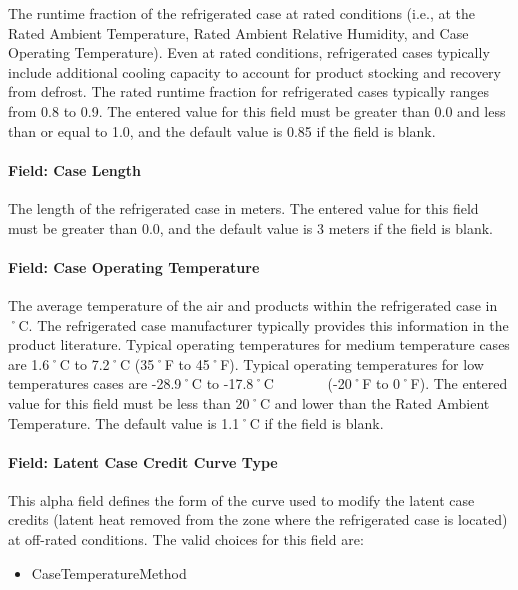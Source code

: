 The runtime fraction of the refrigerated case at rated conditions (i.e., at the Rated Ambient Temperature, Rated Ambient Relative Humidity, and Case Operating Temperature). Even at rated conditions, refrigerated cases typically include additional cooling capacity to account for product stocking and recovery from defrost. The rated runtime fraction for refrigerated cases typically ranges from 0.8 to 0.9. The entered value for this field must be greater than 0.0 and less than or equal to 1.0, and the default value is 0.85 if the field is blank.

\paragraph{Field: Case Length}\label{field-case-length}

The length of the refrigerated case in meters. The entered value for this field must be greater than 0.0, and the default value is 3 meters if the field is blank.

\paragraph{Field: Case Operating Temperature}\label{field-case-operating-temperature}

The average temperature of the air and products within the refrigerated case in ˚C. The refrigerated case manufacturer typically provides this information in the product literature. Typical operating temperatures for medium temperature cases are 1.6˚C to 7.2˚C (35˚F to 45˚F). Typical operating temperatures for low temperatures cases are -28.9˚C to -17.8˚C~~~~~~~ (-20˚F to 0˚F). The entered value for this field must be less than 20˚C and lower than the Rated Ambient Temperature. The default value is 1.1˚C if the field is blank.

\paragraph{Field: Latent Case Credit Curve Type}\label{field-latent-case-credit-curve-type}

This alpha field defines the form of the curve used to modify the latent case credits (latent heat removed from the zone where the refrigerated case is located) at off-rated conditions. The valid choices for this field are:

\begin{itemize}
\tightlist
\item
  CaseTemperatureMethod
\end{itemize}

